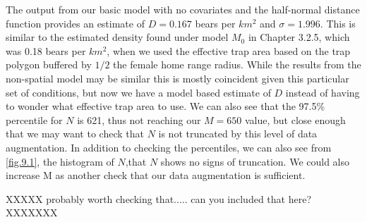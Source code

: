 The output from our basic model with no covariates and the half-normal
distance function provides an estimate of $D = 0.167$ bears per $km^2$
and $\sigma = 1.996$.  This is similar to the estimated density found
under model $M_0$ in Chapter 3.2.5, which was 0.18 bears per $km^2$,
when we used the effective trap area based on the trap polygon
buffered by $1/2$ the female home range radius.
While the results from the non-spatial model may be similar this is mostly coincident given this particular set of
conditions, but now we have a model based estimate of $D$ instead of having to wonder
what effective trap area to use.
We can also see that the 97.5\%
percentile for $N$ is 621, thus not reaching our $M=650$ value, but
close enough that we may want to check that $N$ is not truncated by
this level of data augmentation.  In addition to checking the percentiles, we can also see from \ref{fig.9.1}, the histogram of $N$,that $N$ shows no signs of truncation.  We could also increase
M as another check that our data augmentation is sufficient.


XXXXX probably worth checking that..... can you included that here? XXXXXXX

